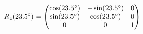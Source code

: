 \documentclass[preview]{standalone}
\begin{document}
\begin{align*}
\special{dvisvgm:raw <g id='unique000'>}R_z(23.5^\circ) = \begin{pmatrix} \cos(23.5^\circ) & -\sin(23.5^\circ) & 0 \\ \sin(23.5^\circ) & \cos(23.5^\circ) & 0 \\ 0 & 0 & 1 \end{pmatrix}\special{dvisvgm:raw </g>}
\end{align*}
\end{document}
